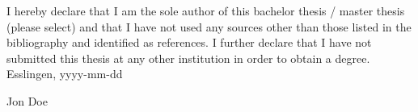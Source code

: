 
I hereby declare that I am the sole author of this bachelor thesis / master thesis
(please select) and that I have not used any sources other than those listed in the
bibliography and identified as references. I further declare that I have not submitted
this thesis at any other institution in order to obtain a degree.\\

\vspace{1cm}
Esslingen, yyyy-mm-dd \\
\begin{flushright}
Jon Doe
\end{flushright}

